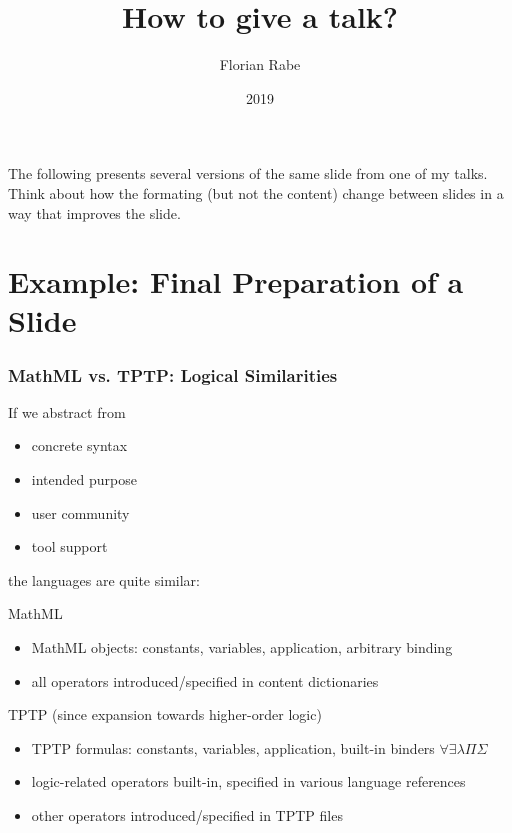 \documentclass{beamer}
\begin{document}
\title{How to give a talk?}
\author{Florian Rabe}
\date{2019}
\begin{frame}
    \titlepage
    
The following presents several versions of the same slide from one of my talks.
Think about how the formating (but not the content) change between slides in a way that improves the slide.
\end{frame}

%

\section{Example: Final Preparation of a Slide}

\begin{frame}\frametitle{MathML vs. TPTP: Logical Similarities}
If we abstract from
\begin{itemize}
  \item concrete syntax
  \item intended purpose
  \item user community
  \item tool support
\end{itemize}
the languages are quite similar:

MathML
\begin{itemize}
 \item MathML objects: constants, variables, application, arbitrary binding
 \item all operators introduced/specified in content dictionaries
\end{itemize}
TPTP (since expansion towards higher-order logic)
\begin{itemize}
 \item TPTP formulas: constants, variables, application, built-in binders $\forall\exists\lambda\Pi\Sigma$
 \item logic-related operators built-in, specified in various language references
 \item other operators introduced/specified in TPTP files
\end{itemize}
\end{frame}
\end{document}
